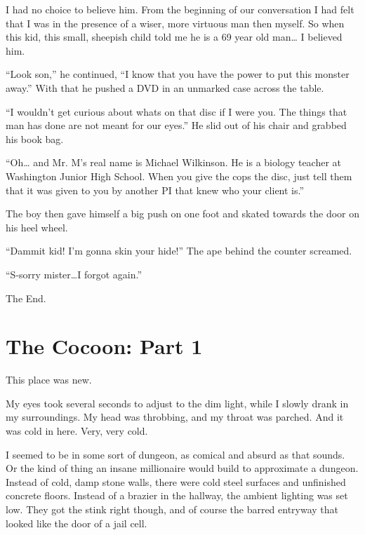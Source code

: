 I had no choice to believe him. From the beginning of our
conversation I had felt that I was in the presence of a wiser, more
virtuous man then myself. So when this kid, this small, sheepish
child told me he is a 69 year old man{\ldots} I believed him.



``Look son,'' he continued, ``I know that you have the power to put
this monster away.'' With that he pushed a DVD in an unmarked case
across the table.



``I wouldn't get curious about whats on that disc if I were you. The
things that man has done are not meant for our eyes.'' He slid out
of his chair and grabbed his book bag.



``Oh{\ldots} and Mr. M's real name is Michael Wilkinson. He is a biology
teacher at Washington Junior High School. When you give the cops
the disc, just tell them that it was given to you by another PI
that knew who your client is.''



The boy then gave himself a big push on one foot and skated towards
the door on his heel wheel.



``Dammit kid! I'm gonna skin your hide!'' The ape behind the counter
screamed.



``S-sorry mister{\ldots}I forgot again.''



The End. 
 





\chapter{The Cocoon: Part 1}


This place was new.



My eyes took several seconds to adjust to the dim light, while I
slowly drank in my surroundings. My head was throbbing, and my
throat was parched. And it was cold in here. Very, very cold.



I seemed to be in some sort of dungeon, as comical and absurd as
that sounds. Or the kind of thing an insane millionaire would build
to approximate a dungeon. Instead of cold, damp stone walls, there
were cold steel surfaces and unfinished concrete floors. Instead of
a brazier in the hallway, the ambient lighting was set low. They
got the stink right though, and of course the barred entryway that
looked like the door of a jail cell.



